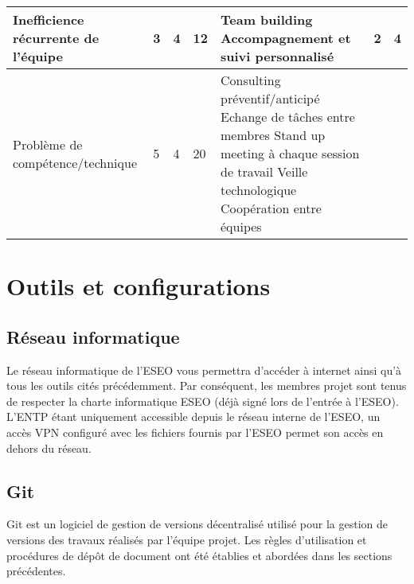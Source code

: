 \documentclass[a4paper,11pt,titlepage]{article}
\begin{document}
\begin{table}[H]
\begin{tabular}{|p{45mm}|p{3mm}|p{3mm}|p{3mm}|p{55mm}|p{13mm}|p{13mm}|}
        Inefficience récurrente de l'équipe                           & 3   & 4   & 12 & {
                Team building\newline
                Accompagnement et suivi personnalisé
        }                                                             & {2} & {4}                                                                        \\ \hline
        Problème de compétence/technique                              & 5   & 4   & 20 & {
                Consulting préventif/anticipé\newline
                Echange de tâches entre membres\newline
                Stand up meeting à chaque session de travail\newline
                Veille technologique\newline
                Coopération entre équipes
        }                                                             & {}  & {}                                                                         \\ \hline
    \end{tabular}
\end{table}

\newpage
\section{Outils et configurations}
\subsection{Réseau informatique}
Le réseau informatique de l'ESEO vous permettra d'accéder à
internet ainsi qu'à tous les outils cités précédemment. Par
conséquent, les membres projet sont tenus de respecter la
charte informatique ESEO (déjà signé lors de l'entrée à l'ESEO).
L'ENTP étant uniquement accessible depuis le réseau interne de
l'ESEO, un accès VPN configuré avec les fichiers fournis par l'ESEO permet son
accès en dehors du réseau. \\

\subsection{Git} \label{sec:Git}
Git est un logiciel de gestion de versions décentralisé utilisé pour la gestion 
de versions des travaux réalisés par l'équipe projet. Les règles d'utilisation et procédures de dépôt de document ont été
établies et abordées dans les sections précédentes. \\
\end{document}
